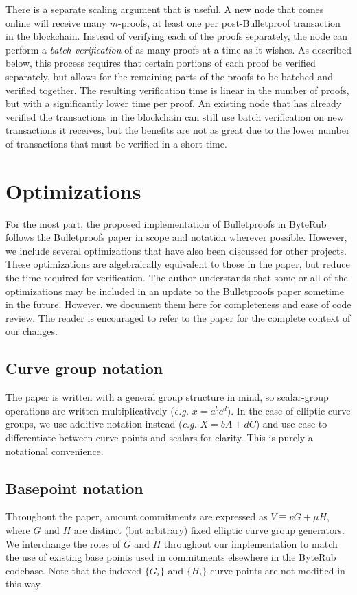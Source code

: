 \documentclass{mrl}
\begin{document}
There is a separate scaling argument that is useful. A new node that comes online will receive many $m$-proofs, at least one per post-Bulletproof transaction in the blockchain. Instead of verifying each of the proofs separately, the node can perform a \textit{batch verification} of as many proofs at a time as it wishes. As described below, this process requires that certain portions of each proof be verified separately, but allows for the remaining parts of the proofs to be batched and verified together. The resulting verification time is linear in the number of proofs, but with a significantly lower time per proof. An existing node that has already verified the transactions in the blockchain can still use batch verification on new transactions it receives, but the benefits are not as great due to the lower number of transactions that must be verified in a short time.

\section{Optimizations}
For the most part, the proposed implementation of Bulletproofs in ByteRub follows the Bulletproofs paper in scope and notation wherever possible. However, we include several optimizations that have also been discussed for other projects. These optimizations are algebraically equivalent to those in the paper, but reduce the time required for verification. The author understands that some or all of the optimizations may be included in an update to the Bulletproofs paper sometime in the future. However, we document them here for completeness and ease of code review. The reader is encouraged to refer to the paper for the complete context of our changes.

\subsection{Curve group notation}
The paper is written with a general group structure in mind, so scalar-group operations are written multiplicatively (\textit{e.g.} $x = a^bc^d$). In the case of elliptic curve groups, we use additive notation instead (\textit{e.g.} $X = bA + dC$) and use case to differentiate between curve points and scalars for clarity. This is purely a notational convenience.

\subsection{Basepoint notation}
Throughout the paper, amount commitments are expressed as $V \equiv vG + \mu H$, where $G$ and $H$ are distinct (but arbitrary) fixed elliptic curve group generators. We interchange the roles of $G$ and $H$ throughout our implementation to match the use of existing base points used in commitments elsewhere in the ByteRub codebase. Note that the indexed $\{G_i\}$ and $\{H_i\}$ curve points are not modified in this way.
\end{document}
